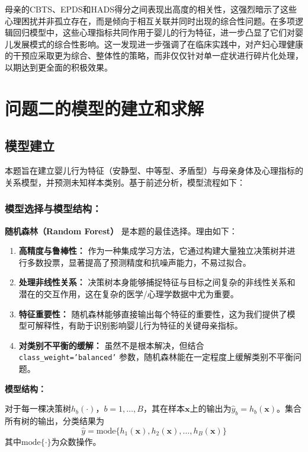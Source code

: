 \documentclass[withoutpreface,bwprint]{cumcmthesis}
\begin{document}
母亲的CBTS、EPDS和HADS得分之间表现出高度的相关性，这强烈暗示了这些心理困扰并非孤立存在，而是倾向于相互关联并同时出现的综合性问题。在多项逻辑回归模型中，这些心理指标共同作用于婴儿的行为特征，进一步凸显了它们对婴儿发展模式的综合性影响。这一发现进一步强调了在临床实践中，对产妇心理健康的干预应采取更为综合、整体性的策略，而非仅仅针对单一症状进行碎片化处理，以期达到更全面的积极效果。



\section{问题二的模型的建立和求解}

\subsection{模型建立}

本题旨在建立婴儿行为特征（安静型、中等型、矛盾型）与母亲身体及心理指标的关系模型，并预测未知样本类别。基于前述分析，模型流程如下：



\subsubsection{\textbf{模型选择与模型结构：}}
        
\noindent\textbf{随机森林（Random Forest）} 是本题的最佳选择。理由如下：
        \begin{enumerate}
            
            \item \textbf{高精度与鲁棒性：} 作为一种集成学习方法，它通过构建大量独立决策树并进行多数投票，显著提高了预测精度和抗噪声能力，不易过拟合。
            \item \textbf{处理非线性关系：} 决策树本身能够捕捉特征与目标之间复杂的非线性关系和潜在的交互作用，这在复杂的医学/心理学数据中尤为重要。
            \item \textbf{特征重要性：} 随机森林能够直接输出每个特征的重要性，这为我们提供了模型可解释性，有助于识别影响婴儿行为特征的关键母亲指标。
            \item \textbf{对类别不平衡的缓解：} 虽然不是根本解决，但结合 \texttt{class\_weight='balanced'} 参数，随机森林能在一定程度上缓解类别不平衡问题。
        \end{enumerate}

\noindent\textbf{模型结构：}
        
对于每一棵决策树$h_b(\cdot)$，$b=1,\ldots,B$，其在样本$\mathbf{x}$上的输出为$\hat{y}_b = h_b(\mathbf{x})$。集合所有树的输出，分类结果为
\begin{equation}
    \hat{y} = \mathrm{mode}\{ h_1(\mathbf{x}), h_2(\mathbf{x}), \ldots, h_B(\mathbf{x}) \}
\end{equation}
其中$\mathrm{mode}\{\cdot\}$为众数操作。
\end{document}
